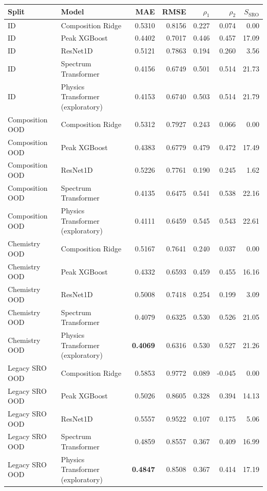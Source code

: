 \small\setlength{\tabcolsep}{5pt}
\begin{tabular}{@{}llrrrrr@{}}
\toprule
Split & Model & MAE & RMSE & $\rho_1$ & $\rho_2$ & $S_{\mathrm{SRO}}$ \\
\midrule
ID & Composition Ridge & 0.5310 & 0.8156 & 0.227 & 0.074 & 0.00 \\
ID & Peak XGBoost & 0.4402 & 0.7017 & 0.446 & 0.457 & 17.09 \\
ID & ResNet1D & 0.5121 & 0.7863 & 0.194 & 0.260 & 3.56 \\
ID & Spectrum Transformer & 0.4156 & 0.6749 & 0.501 & 0.514 & 21.73 \\
ID & Physics Transformer (exploratory) & 0.4153 & 0.6740 & 0.503 & 0.514 & 21.79 \\
Composition OOD & Composition Ridge & 0.5312 & 0.7927 & 0.243 & 0.066 & 0.00 \\
Composition OOD & Peak XGBoost & 0.4383 & 0.6779 & 0.479 & 0.472 & 17.49 \\
Composition OOD & ResNet1D & 0.5226 & 0.7761 & 0.190 & 0.245 & 1.62 \\
Composition OOD & Spectrum Transformer & 0.4135 & 0.6475 & 0.541 & 0.538 & 22.16 \\
Composition OOD & Physics Transformer (exploratory) & 0.4111 & 0.6459 & 0.545 & 0.543 & 22.61 \\
Chemistry OOD & Composition Ridge & 0.5167 & 0.7641 & 0.240 & 0.037 & 0.00 \\
Chemistry OOD & Peak XGBoost & 0.4332 & 0.6593 & 0.459 & 0.455 & 16.16 \\
Chemistry OOD & ResNet1D & 0.5008 & 0.7418 & 0.254 & 0.199 & 3.09 \\
Chemistry OOD & Spectrum Transformer & 0.4079 & 0.6325 & 0.530 & 0.526 & 21.05 \\
Chemistry OOD & Physics Transformer (exploratory) & \textbf{0.4069} & 0.6316 & 0.530 & 0.527 & 21.26 \\
Legacy SRO OOD & Composition Ridge & 0.5853 & 0.9772 & 0.089 & -0.045 & 0.00 \\
Legacy SRO OOD & Peak XGBoost & 0.5026 & 0.8605 & 0.328 & 0.394 & 14.13 \\
Legacy SRO OOD & ResNet1D & 0.5557 & 0.9522 & 0.107 & 0.175 & 5.06 \\
Legacy SRO OOD & Spectrum Transformer & 0.4859 & 0.8557 & 0.367 & 0.409 & 16.99 \\
Legacy SRO OOD & Physics Transformer (exploratory) & \textbf{0.4847} & 0.8508 & 0.367 & 0.414 & 17.19 \\
\bottomrule
\end{tabular}
